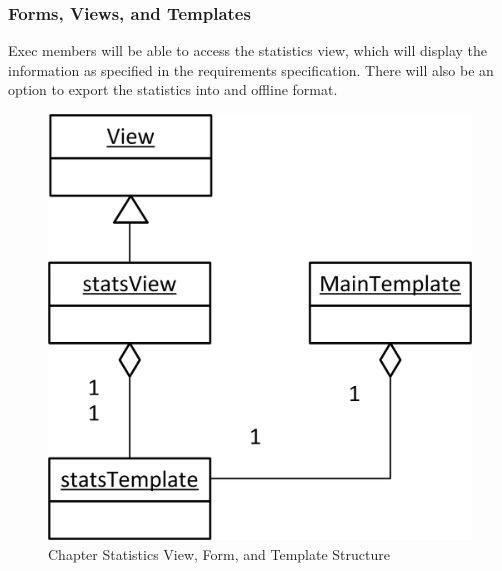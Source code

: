 \documentclass{article}
\begin{document}
\subsubsection{Forms, Views, and Templates}
Exec members will be able to access the statistics view, which will display the information as specified in the requirements specification. There will also be an option to export the statistics into and offline format.

\FloatBarrier
\begin{figure}[h!]
\centering
\includegraphics[scale=.65]{img/viewFormTemplateDiagrams/chapterStats}
\caption{Chapter Statistics View, Form, and Template Structure}
\label{fig:statsViewFormTemplateDiagram}
\end{figure}
\FloatBarrier

\newpage


\end{document}
